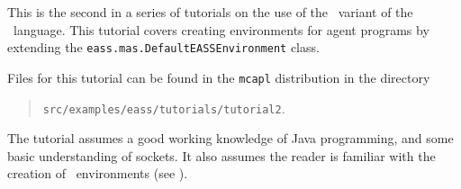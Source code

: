 
This is the second in a series of tutorials on the use of the \eass\ variant of the \gwendolen\ language.  This tutorial covers creating environments for agent programs by extending the \texttt{eass.mas.DefaultEASSEnvironment} class.  

Files for this tutorial can be found in the \texttt{mcapl} distribution in the directory 
\begin{quote}
\texttt{src/examples/eass/tutorials/tutorial2}.
\end{quote}

The tutorial assumes a good working knowledge of Java programming, and some basic understanding of sockets.  It also assumes the reader is familiar with the creation of \ail\ environments (see ).

